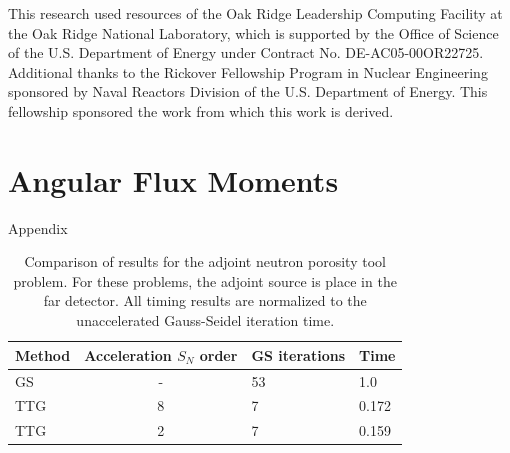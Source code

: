 \documentclass[preprint,12pt]{elsarticle}
\begin{document}
This research used resources of the Oak Ridge Leadership Computing Facility at the Oak Ridge National Laboratory, which is supported by the Office of Science of the U.S. Department of Energy under Contract No. DE-AC05-00OR22725. Additional thanks to the Rickover Fellowship Program in Nuclear Engineering sponsored by Naval Reactors Division of the U.S. Department of Energy. This fellowship sponsored the work from which this work is derived. 


\newpage
\appendix

\section{Angular Flux Moments}
\label{sec:angular-flux-moments}

Appendix


\newpage

\singlespacing





\clearpage

\begin{table}[p]
  \caption{
    Comparison of results for the adjoint neutron porosity tool
    problem. For these problems, the adjoint source is place in the
    far detector.  All timing results are normalized to the
    unaccelerated Gauss-Seidel iteration time.
  }
  \label{tab:adjoint-porosity-tool}
  \begin{center}
    \begin{tabular}{lcll}\hline\hline
      Method & Acceleration $S_N$ order & GS iterations & Time \\\hline
      GS & - & 53 & 1.0   \\
      TTG & 8 & 7 & 0.172 \\
      TTG & 2 & 7 & 0.159 \\
      \hline\hline
    \end{tabular}
  \end{center}
\end{table}
\end{document}
